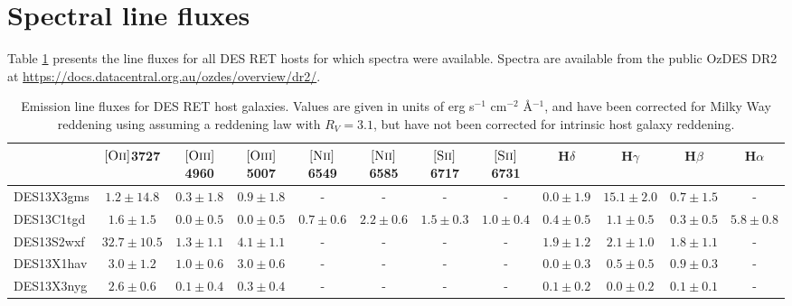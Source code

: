 \documentclass[fleqn,usenatbib,]{mnras}
\newcommand{\halpha}[0]{H$\alpha$}
\newcommand{\hbeta}[0]{H$\beta$}
\newcommand{\hgamma}[0]{H$\gamma$}
\newcommand{\hdelta}[0]{H$\delta$}
\newcommand{\OII}[0]{$[\textnormal{\textsc{Oii}}]$}
\newcommand{\OIII}[0]{$[\textnormal{\textsc{Oiii}}]$}
\newcommand{\SII}[0]{$[\textnormal{\textsc{Sii}}]$}
\newcommand{\NII}[0]{$[\textnormal{\textsc{Nii}}]$}
\begin{document}

\newpage
\appendix
\onecolumn
\section{Spectral line fluxes}
Table \ref{tab:fluxes} presents the line fluxes for all DES RET hosts for which spectra were available. Spectra are available from the public OzDES DR2 at \url{https://docs.datacentral.org.au/ozdes/overview/dr2/}.

\begin{table}

\caption{Emission line fluxes for DES RET host galaxies. Values are given in units of erg s$^{-1}$ cm$^{-2}$ \AA$^{-1}$, and have been corrected for Milky Way reddening using \citet{Schlegel1998} assuming a \citet{Cardelli1989} reddening law with $R_V = 3.1$, but have not been corrected for intrinsic host galaxy reddening.\label{tab:fluxes}}
\setlength{\tabcolsep}{3pt}
\begin{tabular}{lccccccccccc}
\toprule
{} &              \OII 3727 &             \OIII 4960 &              \OIII 5007 &             \NII 6549 &             \NII 6585 &             \SII 6717 &             \SII 6731 &           \hdelta &            \hgamma &             \hbeta &            \halpha \\
\midrule
DES13X3gms  &   $1.2 \pm 14.8$ &  $0.3 \pm 1.8$ &   $0.9 \pm 1.8$ &              - &               - &              - &              - &  $0.0 \pm 1.9$ &  $15.1 \pm 2.0$ &   $0.7 \pm 1.5$ &               - \\
DES13C1tgd  &    $1.6 \pm 1.5$ &  $0.0 \pm 0.5$ &   $0.0 \pm 0.5$ &  $0.7 \pm 0.6$ &   $2.2 \pm 0.6$ &  $1.5 \pm 0.3$ &  $1.0 \pm 0.4$ &  $0.4 \pm 0.5$ &   $1.1 \pm 0.5$ &   $0.3 \pm 0.5$ &   $5.8 \pm 0.8$ \\
DES13S2wxf  &  $32.7 \pm 10.5$ &  $1.3 \pm 1.1$ &   $4.1 \pm 1.1$ &              - &               - &              - &              - &  $1.9 \pm 1.2$ &   $2.1 \pm 1.0$ &   $1.8 \pm 1.1$ &               - \\
DES13X1hav  &    $3.0 \pm 1.2$ &  $1.0 \pm 0.6$ &   $3.0 \pm 0.6$ &              - &               - &              - &              - &  $0.0 \pm 0.3$ &   $0.5 \pm 0.5$ &   $0.9 \pm 0.3$ &               - \\
DES13X3nyg  &    $2.6 \pm 0.6$ &  $0.1 \pm 0.4$ &   $0.3 \pm 0.4$ &              - &               - &              - &              - &  $0.1 \pm 0.2$ &   $0.0 \pm 0.2$ &   $0.1 \pm 0.1$ &               - \\

\end{tabular}
\end{table}
\end{document}
